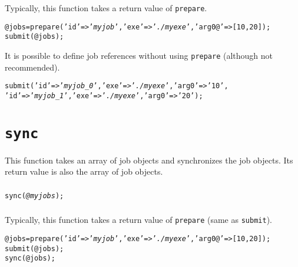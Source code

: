 \documentclass[a4paper,10pt]{report}
\begin{document}
\subsubsection{\example}
Typically, this function takes a return value of \texttt{prepare}.
\begin{boxnote}
\begin{alltt}
@jobs = prepare('id' => '\textit{myjob}', 'exe' => '\textit{./myexe}', 'arg0@' => [10,20]);
submit(@jobs);
\end{alltt}
\end{boxnote}
\vspace{\baselineskip}
It is possible to define job references without using
\texttt{prepare} (although not recommended).
\begin{boxnote}
\begin{alltt}
submit({'id' => '\textit{myjob_0}', 'exe' => '\textit{./myexe}', 'arg0' => '10'},
       {'id' => '\textit{myjob_1}', 'exe' => '\textit{./myexe}', 'arg0' => '20'});
\end{alltt}
\end{boxnote}

\section{\texttt{sync}}

This function takes an array of job objects and synchronizes the job objects.
Its return value is also the array of job objects.

\subsubsection{\format}

\begin{boxnote}
\begin{alltt}
sync(\textit{@myjobs});
\end{alltt}
\end{boxnote}
\vspace{\baselineskip}

\subsubsection{\example}

Typically, this function takes a return value of \texttt{prepare}
(same as \texttt{submit}).
\begin{boxnote}
\begin{alltt}
@jobs = prepare('id' => '\textit{myjob}', 'exe' => '\textit{./myexe}', 'arg0@' => [10,20]);
submit(@jobs);
sync(@jobs);
\end{alltt}
\end{boxnote}
\end{document}
